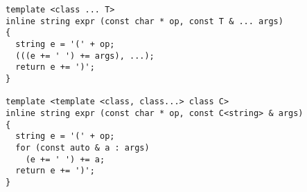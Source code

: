 \begin{algorithm}[H]
\end{algorithm}

\begin{algorithm}[H]
\end{algorithm}

\begin{algorithm}[H]
\end{algorithm}

\begin{algorithm}[H]
\end{algorithm}

\begin{algorithm}[H]
\end{algorithm}

\begin{lstlisting}[style=c++]
template <class ... T>
inline string expr (const char * op, const T & ... args)
{
  string e = '(' + op;
  (((e += ' ') += args), ...);
  return e += ')';
}

template <template <class, class...> class C>
inline string expr (const char * op, const C<string> & args)
{
  string e = '(' + op;
  for (const auto & a : args)
    (e += ' ') += a;
  return e += ')';
}
\end{lstlisting}

